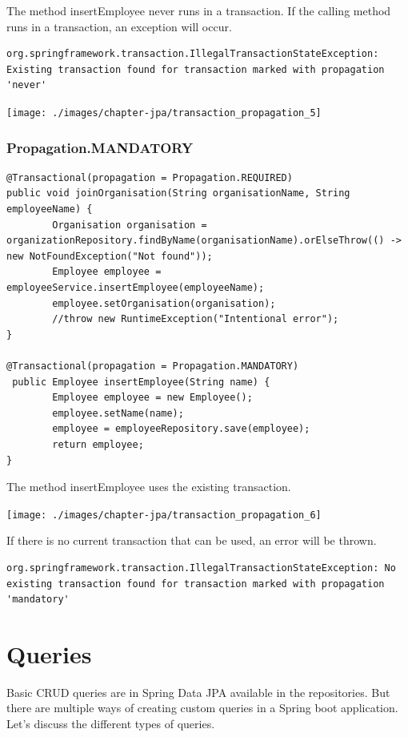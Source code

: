 The method insertEmployee never runs in a transaction. If the calling method
runs in a transaction, an exception will occur.

\begin{verbatim}
org.springframework.transaction.IllegalTransactionStateException: Existing transaction found for transaction marked with propagation 'never'
\end{verbatim}

\texttt{[image: ./images/chapter-jpa/transaction\_propagation\_5]}

\subsubsection{Propagation.MANDATORY}

\begin{lstlisting}
@Transactional(propagation = Propagation.REQUIRED)
public void joinOrganisation(String organisationName, String employeeName) {
        Organisation organisation = organizationRepository.findByName(organisationName).orElseThrow(() -> new NotFoundException("Not found"));
        Employee employee = employeeService.insertEmployee(employeeName);
        employee.setOrganisation(organisation);
        //throw new RuntimeException("Intentional error");
}

@Transactional(propagation = Propagation.MANDATORY)
 public Employee insertEmployee(String name) {
        Employee employee = new Employee();
        employee.setName(name);
        employee = employeeRepository.save(employee);
        return employee;
}
\end{lstlisting}

The method insertEmployee uses the existing transaction.

\texttt{[image: ./images/chapter-jpa/transaction\_propagation\_6]}

 If there is no current transaction that can be used, an error will be thrown. 

\begin{verbatim}
org.springframework.transaction.IllegalTransactionStateException: No existing transaction found for transaction marked with propagation 'mandatory'
\end{verbatim}

\section{Queries}

Basic CRUD queries are in Spring Data JPA available in the repositories. But there are multiple ways of creating custom queries in a Spring boot application. Let's discuss the different types of queries.

